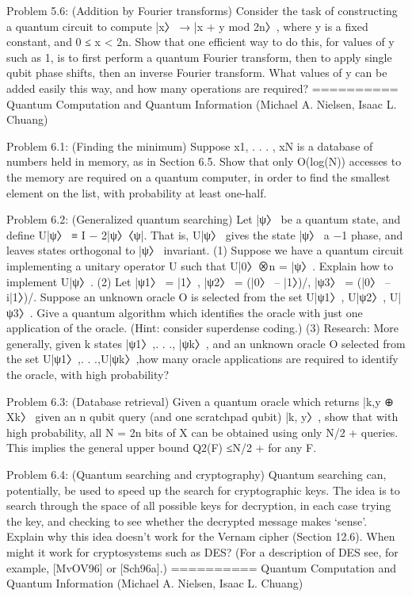 \documentclass{article}
\newcommand{\0}{{$|0\rangle$}}
\newcommand{\1}{{$|1\rangle$}}
\newcommand{\2}{\frac{1}{\sqrt{2}}}
\begin{document}
Problem 5.6: (Addition by Fourier transforms) Consider the task of constructing a quantum circuit to compute |x〉 → |x + y mod 2n〉, where y is a fixed constant, and 0 ≤ x < 2n. Show that one efficient way to do this, for values of y such as 1, is to first perform a quantum Fourier transform, then to apply single qubit phase shifts, then an inverse Fourier transform. What values of y can be added easily this way, and how many operations are required?
==========
Quantum Computation and Quantum Information (Michael A. Nielsen, Isaac L. Chuang)

Problem 6.1: (Finding the minimum) Suppose x1, . . . , xN is a database of numbers held in memory, as in Section 6.5. Show that only O(log(N)) accesses to the memory are required on a quantum computer, in order to find the smallest element on the list, with probability at least one-half.

Problem 6.2: (Generalized quantum searching) Let |ψ〉 be a quantum state, and define U|ψ〉 ≡ I − 2|ψ〉〈ψ|. That is, U|ψ〉 gives the state |ψ〉 a −1 phase, and leaves states orthogonal to |ψ〉 invariant. (1) Suppose we have a quantum circuit implementing a unitary operator U such that U|0〉⊗n = |ψ〉. Explain how to implement U|ψ〉. (2) Let |ψ1〉 = |1〉, |ψ2〉 = (|0〉 – |1〉)/, |ψ3〉 = (|0〉 – i|1〉)/. Suppose an unknown oracle O is selected from the set U|ψ1〉, U|ψ2〉, U|ψ3〉. Give a quantum algorithm which identifies the oracle with just one application of the oracle. (Hint: consider superdense coding.) (3) Research: More generally, given k states |ψ1〉,. . ., |ψk〉, and an unknown oracle O selected from the set U|ψ1〉,. . .,U|ψk〉,how many oracle applications are required to identify the oracle, with high probability?

Problem 6.3: (Database retrieval) Given a quantum oracle which returns |k,y ⊕ Xk〉 given an n qubit query (and one scratchpad qubit) |k, y〉, show that with high probability, all N = 2n bits of X can be obtained using only N/2 + queries. This implies the general upper bound Q2(F) ≤N/2 + for any F.

Problem 6.4: (Quantum searching and cryptography) Quantum searching can, potentially, be used to speed up the search for cryptographic keys. The idea is to search through the space of all possible keys for decryption, in each case trying the key, and checking to see whether the decrypted message makes ‘sense’. Explain why this idea doesn’t work for the Vernam cipher (Section 12.6). When might it work for cryptosystems such as DES? (For a description of DES see, for example, [MvOV96] or [Sch96a].)
==========
Quantum Computation and Quantum Information (Michael A. Nielsen, Isaac L. Chuang)
\end{document}
